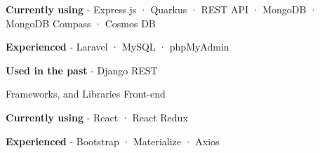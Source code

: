 \begin{cventries}
{\begin{cvitems}
    \item {\textbf{Currently using} \hspace{0.03cm} - \hspace{0.03cm} Express.js \hspace{0.03cm} · \hspace{0.03cm} Quarkus \hspace{0.03cm} · \hspace{0.03cm} REST API \hspace{0.03cm} · \hspace{0.03cm} MongoDB \hspace{0.03cm} · \hspace{0.03cm} MongoDB Compass \hspace{0.03cm} · \hspace{0.03cm} Cosmos DB} %
    \item {\textbf{Experienced} \hspace{0.03cm} - \hspace{0.03cm} Laravel \hspace{0.03cm} · \hspace{0.03cm} MySQL \hspace{0.03cm} · \hspace{0.03cm} phpMyAdmin} %
    \item {\textbf{Used in the past} \hspace{0.03cm} - \hspace{0.03cm} Django REST \\} %
  \end{cvitems}
}
  \cventry
    {Frameworks, and Libraries} %
    {Front-end} %
    {} %
    {} %
    {
      \begin{cvitems} %
        \item {\textbf{Currently using} \hspace{0.03cm} - \hspace{0.03cm} React \hspace{0.03cm} · \hspace{0.03cm} React Redux} %
        \item {\textbf{Experienced} \hspace{0.03cm} - \hspace{0.03cm} Bootstrap \hspace{0.03cm} · \hspace{0.03cm} Materialize \hspace{0.03cm} · \hspace{0.03cm} Axios} %

\end{cvitems}}
\end{cventries}
